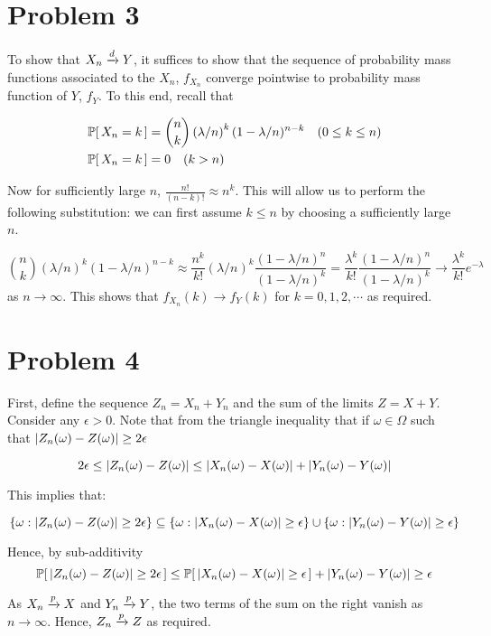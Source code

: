 \documentclass[12pt]{article}%
\begin{document}
\section{Problem 3}
To show that $X_n \xrightarrow[]{d} Y$, it suffices to show that the sequence of probability mass functions associated to the $X_n$, $f_{X_n}$ converge pointwise to probability mass function of $Y$, $f_Y$. To this end, recall that

\begin{align*}
  \mathbb{P}[\,X_n = k\,] & = {n \choose k}\left(\lambda/n\right)^k(1 - \lambda/n)^{n-k} \quad (0 \leq k \leq n) \\
  \mathbb{P}[\,X_n = k\,] & = 0 \quad (k > n)
\end{align*}

Now for sufficiently large $n$, $\frac{n!}{(n-k)!} \approx n^k$. This will allow us to perform the following substitution: we can first assume $k \leq n$ by choosing a sufficiently large $n$.

\[{n \choose k}\left(\lambda/n\right)^k(1 - \lambda/n)^{n-k} \approx \frac{n^k }{k!}(\lambda/n)^k \frac{(1-\lambda/n)^{n}}{(1-\lambda/n)^{k}}  = \frac{\lambda^k}{k!}\frac{(1-\lambda/n)^{n}}{(1-\lambda/n)^{k}} \rightarrow \frac{\lambda^k}{k!}e^{-\lambda}  \]
as $n \rightarrow \infty$. This shows that $f_{X_n}(k) \rightarrow f_Y(k)$ for $k = 0,1,2, \cdots$ as required.

\section{Problem 4}
First, define the sequence $Z_n = X_n + Y_n$ and the sum of the limits $Z = X + Y$. Consider any $\epsilon >0$. Note that from the triangle inequality that if $\omega \in \Omega$ such that $\abs{Z_n(\omega) - Z(\omega)} \geq 2\epsilon$

\[ 2 \epsilon \leq \abs{Z_n(\omega) - Z(\omega)} \leq \abs{X_n(\omega) - X(\omega)} + \abs{Y_n(\omega) - Y(\omega)} \]

This implies that:

\[ \{\omega : \abs{Z_n(\omega) - Z(\omega)} \geq 2\epsilon\} \subseteq \{\omega :\abs{X_n(\omega) - X(\omega)} \geq \epsilon \} \cup \{\omega :\abs{Y_n(\omega) - Y(\omega)} \geq \epsilon \}  \]

Hence, by sub-additivity
\[ \mathbb{P}[\,\abs{Z_n(\omega) - Z(\omega)} \geq 2\epsilon\,] \leq \mathbb{P}[\,\abs{X_n(\omega) - X(\omega)} \geq \epsilon\,] + \abs{Y_n(\omega) - Y(\omega)} \geq \epsilon \]

As $X_n \xrightarrow[]{p} X$ and $Y_n \xrightarrow[]{p} Y$, the two terms of the sum on the right vanish as $n \rightarrow \infty$. Hence, $Z_n \xrightarrow[]{p} Z$ as required.
\end{document}
